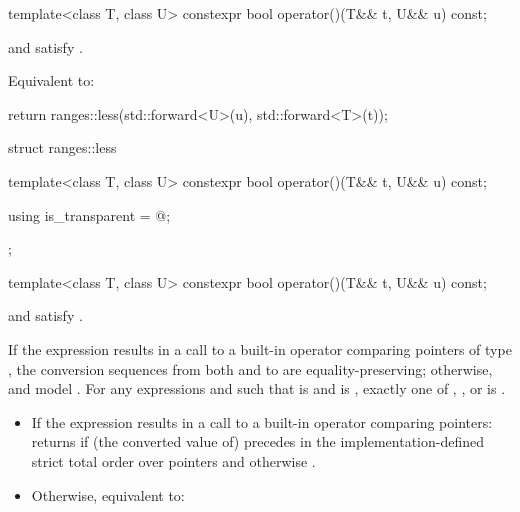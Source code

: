 \begin{itemdecl}
template<class T, class U>
  constexpr bool operator()(T&& t, U&& u) const;
\end{itemdecl}

\begin{itemdescr}
\pnum
\constraints
{} and  satisfy .

\pnum
\effects
Equivalent to:
\begin{codeblock}
return ranges::less{}(std::forward<U>(u), std::forward<T>(t));
\end{codeblock}
\end{itemdescr}

%
\begin{codeblock}
struct ranges::less {
  template<class T, class U>
    constexpr bool operator()(T&& t, U&& u) const;

  using is_transparent = @\unspecnc@;
};
\end{codeblock}

\begin{itemdecl}
template<class T, class U>
  constexpr bool operator()(T&& t, U&& u) const;
\end{itemdecl}

\begin{itemdescr}
\pnum
\constraints
{} and  satisfy .

\pnum
\expects
If the expression  results in a
call to a built-in operator \tcode{<} comparing pointers of type , the
conversion sequences from both  and  to  are
equality-preserving;
otherwise,  and  model .
For any expressions
 and  such that  is  and
 is , exactly one of
,
, or
is .

\pnum
\effects
\begin{itemize}
\item
If the expression  results in a
call to a built-in operator \tcode{<} comparing pointers:
returns  if (the converted value of)  precedes  in
the implementation-defined strict total order over pointers
and otherwise .

\item
Otherwise, equivalent to:
\end{itemize}
\end{itemdescr}


